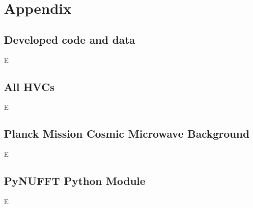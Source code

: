 \setcounter{chapter}{7}
\setcounter{section}{0}

\renewcommand*{\thechapter}{}

\appendix

\chapter{Appendix}
\label{cha:appendix}

\renewcommand*{\thesection}{\Alph{section}}

\section{Developed code and data}
\label{sec:appendixA}

E

\section{All HVCs}
\label{sec:appendixB}

E

\section{Planck Mission Cosmic Microwave Background}
\label{sec:appendixC}

E

\section{PyNUFFT Python Module}
\label{sec:appendixD}

E